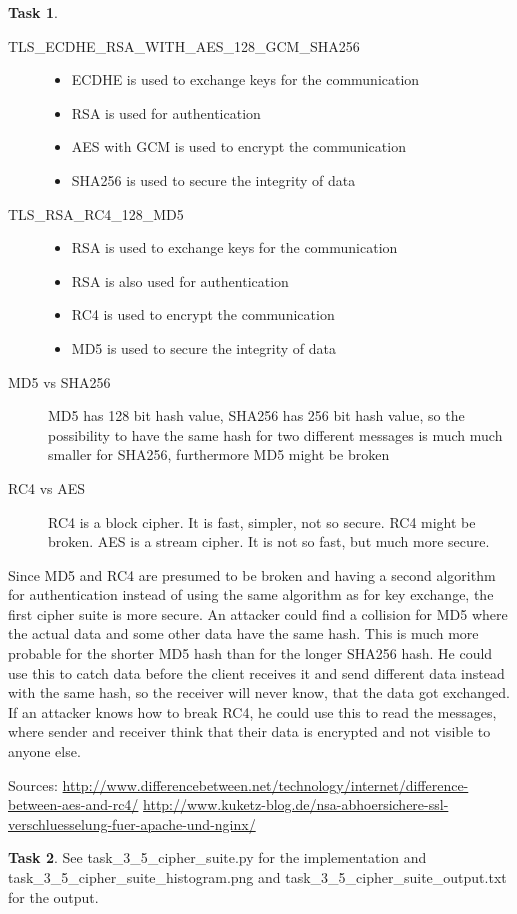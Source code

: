\documentclass[fleqn]{scrartcl}
\theoremstyle{definition}
\newtheorem{exercise}{Task}
\begin{document}
\begin{exercise}\hfill

    \begin{description}
        \item[TLS\_ECDHE\_RSA\_WITH\_AES\_128\_GCM\_SHA256]\hfill

            \begin{itemize}
                \item ECDHE is used to exchange keys for the communication
                \item RSA is used for authentication
                \item AES with GCM is used to encrypt the communication
                \item SHA256 is used to secure the integrity of data
            \end{itemize}

\item[TLS\_RSA\_RC4\_128\_MD5]
    \begin{itemize}
        \item RSA is used to exchange keys for the communication
        \item RSA is also used for authentication
        \item RC4 is used to encrypt the communication
        \item MD5 is used to secure the integrity of data
    \end{itemize}

\item[MD5 vs SHA256]
    MD5 has 128 bit hash value,
    SHA256 has 256 bit hash value,
    so the possibility to have the same hash for two different messages is much much smaller for SHA256,
    furthermore MD5 might be broken

\item[RC4 vs AES]
    RC4 is a block cipher. It is fast, simpler, not so secure. RC4 might be broken.
    AES is a stream cipher. It is not so fast, but much more secure.
    \end{description}

Since MD5 and RC4 are presumed to be broken and having a second algorithm for authentication instead of using the same algorithm as for key exchange, the first cipher suite is more secure.
An attacker could find a collision for MD5 where the actual data and some other data have the same hash. This is much more probable for the shorter MD5 hash than for the longer SHA256 hash.
He could use this to catch data before the client receives it and send different data instead with the same hash, so the receiver will never know, that the data got exchanged.
If an attacker knows how to break RC4, he could use this to read the messages, where sender and receiver think that their data is encrypted and not visible to anyone else.

Sources:
\url{http://www.differencebetween.net/technology/internet/difference-between-aes-and-rc4/}
\url{http://www.kuketz-blog.de/nsa-abhoersichere-ssl-verschluesselung-fuer-apache-und-nginx/}
\end{exercise}

\begin{exercise}
See task\_3\_5\_cipher\_suite.py for the implementation and
task\_3\_5\_cipher\_suite\_histogram.png and task\_3\_5\_cipher\_suite\_output.txt for the
output.
\end{exercise}
\end{document}
